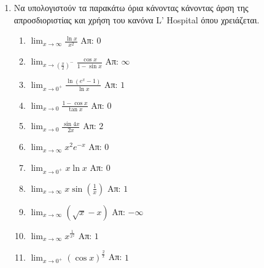 \documentclass[a4paper,table]{report}
\begin{document}
\begin{enumerate}
  \item Να υπολογιστούν τα παρακάτω όρια κάνοντας κάνοντας άρση της απροσδιοριστίας 
    και χρήση του κανόνα L' Hospital όπου χρειάζεται.

    \begin{enumerate}
      \item $\lim_{x\to \infty}\frac{\ln x}{x^2}$ \hfill Απ: $0$
      \item $\lim_{x\to (\frac{\pi}{2})^-}\frac{\cos x}{1-\sin x}$ \hfill Απ: $\infty$
      \item $\lim_{x\to 0^+}\frac{\ln(e^x-1)}{\ln x}$ \hfill Απ: $1$
      \item $\lim_{x\to 0}\frac{1-\cos x }{\tan x}$ \hfill Απ: $0$
      \item $\lim_{x\to 0}\frac{\sin 4x}{2x}$ \hfill Απ: $2$
      \item $\lim_{x\to \infty}x^2e^{-x}$ \hfill Απ: $0$
      \item $\lim_{x\to 0^+}x\ln x$ \hfill Απ: $0$
      \item $\lim_{x\to \infty}x\sin(\frac{1}{x})$ \hfill Απ: $1$
      \item $\lim_{x\to \infty}(\sqrt{x} - x)$ \hfill Απ: $-\infty$
      \item $\lim_{x\to \infty}x^{\frac{1}{x^2}}$ \hfill Απ: $1$
      \item $\lim_{x\to 0^+}(\cos x)^{\frac{2}{x}}$ \hfill Απ: $1$
    \end{enumerate}
\end{enumerate}
\end{document}

